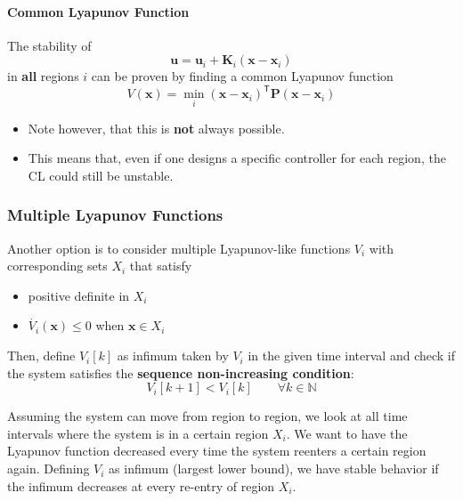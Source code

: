 \paragraph{Common Lyapunov Function}
The stability of
\noindent\begin{equation*}
    \mathbf{u} = \mathbf{u}_i+\mathbf{K}_i(\mathbf{x}-\mathbf{x}_i)
\end{equation*}
in \textbf{all} regions $i$ can be proven by finding a common Lyapunov function
\noindent\begin{equation*}
    V(\mathbf{x}) = \min_{i} {(\mathbf{x}-\mathbf{x}_i)}^{\mathsf{T}}\mathbf{P}(\mathbf{x}-\mathbf{x}_i)
\end{equation*}
\begin{itemize}
    \item Note however, that this is \textbf{not} always possible.
    \item This means that, even if one designs a specific controller for each region, the CL could still be unstable.

\end{itemize}

\subsubsection{Multiple Lyapunov Functions}
Another option is to consider multiple Lyapunov-like functions $V_i$ with corresponding sets $X_i$ that satisfy
\begin{itemize}
    \item positive definite in $X_i$
    \item $\dot{V_i}(\mathbf{x})\leq 0$ when $\mathbf{x}\in X_i$
\end{itemize}
Then, define $V_i[k]$ as infimum taken by $V_i$ in the given time interval and check if the system satisfies the \textbf{sequence non-increasing condition}:
\noindent\begin{equation*}
    V_i[k+1] < V_i[k] \qquad \forall k \in \mathbb{N}
\end{equation*}

\newpar{}

Assuming the system can move from region to region, we look at all time intervals where the system is in a certain region $X_i$. We want to have the Lyapunov function decreased every time the system reenters a certain region again. Defining $V_i$ as infimum (largest lower bound), we have stable behavior if the infimum decreases at every re-entry of region $X_i$.

